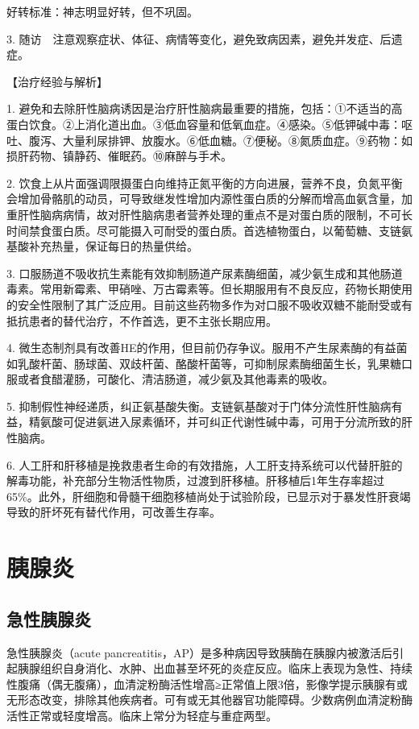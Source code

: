 好转标准：神志明显好转，但不巩固。

3.
随访　注意观察症状、体征、病情等变化，避免致病因素，避免并发症、后遗症。

【治疗经验与解析】

1.
避免和去除肝性脑病诱因是治疗肝性脑病最重要的措施，包括：①不适当的高蛋白饮食。②上消化道出血。③低血容量和低氧血症。④感染。⑤低钾碱中毒：呕吐、腹泻、大量利尿排钾、放腹水。⑥低血糖。⑦便秘。⑧氮质血症。⑨药物：如损肝药物、镇静药、催眠药。⑩麻醉与手术。

2.
饮食上从片面强调限摄蛋白向维持正氮平衡的方向进展，营养不良，负氮平衡会增加骨骼肌的动员，可导致继发性增加内源性蛋白质的分解而增高血氨含量，加重肝性脑病病情，故对肝性脑病患者营养处理的重点不是对蛋白质的限制，不可长时间禁食蛋白质。尽可能摄入可耐受的蛋白质。首选植物蛋白，以葡萄糖、支链氨基酸补充热量，保证每日的热量供给。

3.
口服肠道不吸收抗生素能有效抑制肠道产尿素酶细菌，减少氨生成和其他肠道毒素。常用新霉素、甲硝唑、万古霉素等。但长期服用有不良反应，药物长期使用的安全性限制了其广泛应用。目前这些药物多作为对口服不吸收双糖不能耐受或有抵抗患者的替代治疗，不作首选，更不主张长期应用。

4.
微生态制剂具有改善HE的作用，但目前仍存争议。服用不产生尿素酶的有益菌如乳酸杆菌、肠球菌、双歧杆菌、酪酸杆菌等，可抑制尿素酶细菌生长，乳果糖口服或者食醋灌肠，可酸化、清洁肠道，减少氨及其他毒素的吸收。

5.
抑制假性神经递质，纠正氨基酸失衡。支链氨基酸对于门体分流性肝性脑病有益，精氨酸可促进氨进入尿素循环，并可纠正代谢性碱中毒，可用于分流所致的肝性脑病。

6.
人工肝和肝移植是挽救患者生命的有效措施，人工肝支持系统可以代替肝脏的解毒功能，补充部分生物活性物质，过渡到肝移植。肝移植后1年生存率超过65\%。此外，肝细胞和骨髓干细胞移植尚处于试验阶段，已显示对于暴发性肝衰竭导致的肝坏死有替代作用，可改善生存率。

\section{胰腺炎}

\subsection{急性胰腺炎}

急性胰腺炎（acute
pancreatitis，AP）是多种病因导致胰酶在胰腺内被激活后引起胰腺组织自身消化、水肿、出血甚至坏死的炎症反应。临床上表现为急性、持续性腹痛（偶无腹痛），血清淀粉酶活性增高≥正常值上限3倍，影像学提示胰腺有或无形态改变，排除其他疾病者。可有或无其他器官功能障碍。少数病例血清淀粉酶活性正常或轻度增高。临床上常分为轻症与重症两型。

